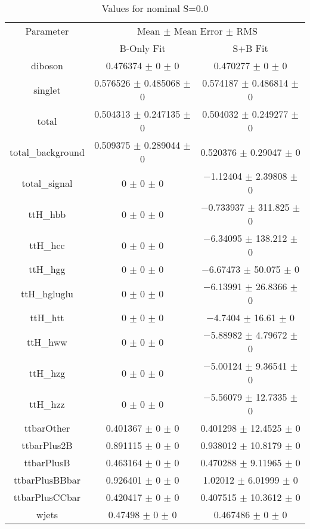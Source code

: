 \begin{table}
\centering
\caption{Values for nominal S=0.0}
\begin{tabular}{ccc}
\toprule
Parameter & \multicolumn{2}{c}{Mean $\pm$ Mean Error $\pm$ RMS}\\
 & B-Only Fit & S+B Fit\\
\midrule
diboson & \num{0.476374} $\pm$ \num{0} $\pm$ \num{0} & \num{0.470277} $\pm$ \num{0} $\pm$ \num{0}\\
singlet & \num{0.576526} $\pm$ \num{0.485068} $\pm$ \num{0} & \num{0.574187} $\pm$ \num{0.486814} $\pm$ \num{0}\\
total & \num{0.504313} $\pm$ \num{0.247135} $\pm$ \num{0} & \num{0.504032} $\pm$ \num{0.249277} $\pm$ \num{0}\\
total\_background & \num{0.509375} $\pm$ \num{0.289044} $\pm$ \num{0} & \num{0.520376} $\pm$ \num{0.29047} $\pm$ \num{0}\\
total\_signal & \num{0} $\pm$ \num{0} $\pm$ \num{0} & \num{-1.12404} $\pm$ \num{2.39808} $\pm$ \num{0}\\
ttH\_hbb & \num{0} $\pm$ \num{0} $\pm$ \num{0} & \num{-0.733937} $\pm$ \num{311.825} $\pm$ \num{0}\\
ttH\_hcc & \num{0} $\pm$ \num{0} $\pm$ \num{0} & \num{-6.34095} $\pm$ \num{138.212} $\pm$ \num{0}\\
ttH\_hgg & \num{0} $\pm$ \num{0} $\pm$ \num{0} & \num{-6.67473} $\pm$ \num{50.075} $\pm$ \num{0}\\
ttH\_hgluglu & \num{0} $\pm$ \num{0} $\pm$ \num{0} & \num{-6.13991} $\pm$ \num{26.8366} $\pm$ \num{0}\\
ttH\_htt & \num{0} $\pm$ \num{0} $\pm$ \num{0} & \num{-4.7404} $\pm$ \num{16.61} $\pm$ \num{0}\\
ttH\_hww & \num{0} $\pm$ \num{0} $\pm$ \num{0} & \num{-5.88982} $\pm$ \num{4.79672} $\pm$ \num{0}\\
ttH\_hzg & \num{0} $\pm$ \num{0} $\pm$ \num{0} & \num{-5.00124} $\pm$ \num{9.36541} $\pm$ \num{0}\\
ttH\_hzz & \num{0} $\pm$ \num{0} $\pm$ \num{0} & \num{-5.56079} $\pm$ \num{12.7335} $\pm$ \num{0}\\
ttbarOther & \num{0.401367} $\pm$ \num{0} $\pm$ \num{0} & \num{0.401298} $\pm$ \num{12.4525} $\pm$ \num{0}\\
ttbarPlus2B & \num{0.891115} $\pm$ \num{0} $\pm$ \num{0} & \num{0.938012} $\pm$ \num{10.8179} $\pm$ \num{0}\\
ttbarPlusB & \num{0.463164} $\pm$ \num{0} $\pm$ \num{0} & \num{0.470288} $\pm$ \num{9.11965} $\pm$ \num{0}\\
ttbarPlusBBbar & \num{0.926401} $\pm$ \num{0} $\pm$ \num{0} & \num{1.02012} $\pm$ \num{6.01999} $\pm$ \num{0}\\
ttbarPlusCCbar & \num{0.420417} $\pm$ \num{0} $\pm$ \num{0} & \num{0.407515} $\pm$ \num{10.3612} $\pm$ \num{0}\\
wjets & \num{0.47498} $\pm$ \num{0} $\pm$ \num{0} & \num{0.467486} $\pm$ \num{0} $\pm$ \num{0}\\
\bottomrule
\end{tabular}
\end{table}